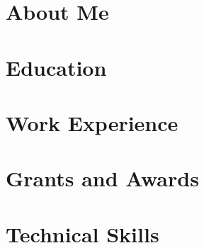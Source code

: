 \documentclass[letter,10pt]{article}
\begin{document}
\section{About Me}


\section{Education}


\section{Work Experience}


% 

\section{Grants and Awards}


% 

\section{Technical Skills}

\end{document}
